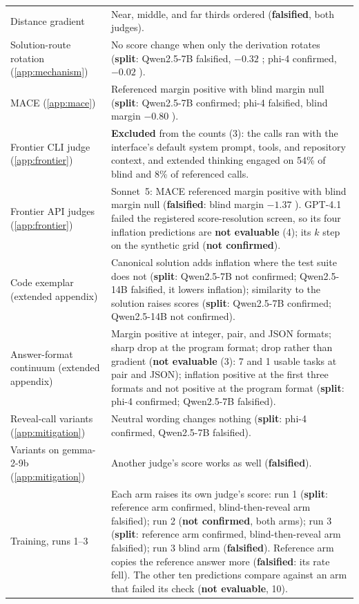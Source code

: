 {\begin{longtable}{L{3.5cm}L{9.5cm}}
Distance gradient & Near, middle, and far thirds ordered (\textbf{falsified}, both judges). \\
Solution-route rotation (\cref{app:mechanism}) & No score change when only the derivation rotates (\textbf{split}: Qwen2.5-7B falsified, $-0.32$ ; phi-4 confirmed, $-0.02$ ). \\
\textsc{MACE} (\cref{app:mace}) & Referenced margin positive with blind margin null (\textbf{split}: Qwen2.5-7B confirmed; phi-4 falsified, blind margin $-0.80$ ). \\
Frontier CLI judge (\cref{app:frontier}) & \textbf{Excluded} from the counts (3): the calls ran with the interface's default system prompt, tools, and repository context, and extended thinking engaged on 54\% of blind and 8\% of referenced calls. \\
Frontier API judges (\cref{app:frontier}) & Sonnet~5: \textsc{MACE} referenced margin positive with blind margin null (\textbf{falsified}: blind margin $-1.37$ ). GPT-4.1 failed the registered score-resolution screen, so its four inflation predictions are \textbf{not evaluable} (4); its $k$ step on the synthetic grid (\textbf{not confirmed}). \\
Code exemplar (extended appendix) & Canonical solution adds inflation where the test suite does not (\textbf{split}: Qwen2.5-7B not confirmed; Qwen2.5-14B falsified, it lowers inflation); similarity to the solution raises scores (\textbf{split}: Qwen2.5-7B confirmed; Qwen2.5-14B not confirmed). \\
Answer-format continuum (extended appendix) & Margin positive at integer, pair, and JSON formats; sharp drop at the program format; drop rather than gradient (\textbf{not evaluable} (3): 7 and 1 usable tasks at pair and JSON); inflation positive at the first three formats and not positive at the program format (\textbf{split}: phi-4 confirmed; Qwen2.5-7B falsified). \\
Reveal-call variants (\cref{app:mitigation}) & Neutral wording changes nothing (\textbf{split}: phi-4 confirmed, Qwen2.5-7B falsified). \\
Variants on gemma-2-9b (\cref{app:mitigation}) & Another judge's score works as well (\textbf{falsified}). \\
Training, runs 1--3 & Each arm raises its own judge's score: run 1 (\textbf{split}: reference arm confirmed, blind-then-reveal arm falsified); run 2 (\textbf{not confirmed}, both arms); run 3 (\textbf{split}: reference arm confirmed, blind-then-reveal arm falsified); run 3 blind arm (\textbf{falsified}). Reference arm copies the reference answer more (\textbf{falsified}: its rate fell). The other ten predictions compare against an arm that failed its check (\textbf{not evaluable}, 10). \\

\end{longtable}}
